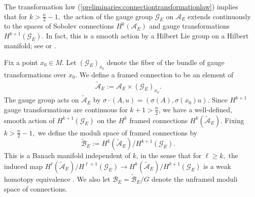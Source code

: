 \documentclass[12pt]{amsart}
\renewcommand{\1}{{\mathbf 1}}
\newcommand{\calB}{\mathcal{B}}
\newcommand{\calA}{\mathcal{A}}
\theoremstyle{others}
\numberwithin{equation}{section}
\begin{document}
The transformation law (\ref{preliminaries:connectiontransformationlaw}) implies that %
for $k > \frac{n}{2} - 1,$ the action of the gauge group $\mathcal{G}_E$ on $\calA_E$ extends continuously to the spaces of Sobolev connections \(H^k(\mathcal{A}_E)\) and gauge transformations \(H^{k+1}(\mathcal{G}_E)\). In fact, this is a smooth action by a Hilbert Lie group on a Hilbert manifold; see \cite[ and Appendix A]{freeduhlenbeck} or %
\cite[.1]{donkron}. \par 
Fix a point \(x_0 \in M\). Let $(\mathcal{G}_E)_{x_0}$ denote the fiber of the bundle of gauge transformations over $x_0.$ We define a framed connection to be an element of
\begin{align*}
    \tilde{\mathcal{A}}_E := \mathcal{A}_E \times (\mathcal{G}_E)_{x_0}.
\end{align*}The gauge group acts on \(\tilde{\mathcal{A}}_E\) by \(\sigma\cdot(A, u) = (\sigma(A), \sigma(x_0)u)\). Since \(H^{k+1}\) gauge transformations are continuous for \(k+1 > \frac{n}{2}\), we have a well-defined, smooth %
action of \(H^{k+1}(\mathcal{G}_E)\) on the \(H^k\) framed connections \(H^k(\tilde{\mathcal{A}}_E)\). Fixing $k > \frac{n}{2} - 1,$ we define the moduli space of framed connections by
$$\tilde{\mathcal{B}}_E:=H^k(\tilde{\mathcal{A}}_E)/H^{k+1}(\mathcal{G}_E).$$
This is a Banach manifold independent of \(k\), in the sense that for $\ell \geq k,$ the induced map \(H^\ell(\tilde{\mathcal{A}}_E)/H^{\ell+1}(\mathcal{G}_E) \to H^k(\tilde{\mathcal{A}}_E)/H^{k+1}(\mathcal{G}_E)\) %
is a weak homotopy equivalence \cite[\S 5.1.1]{donkron}. We also let $\calB_E = \tilde{\calB}_E / G$ denote the unframed moduli space of connections.






\vspace{5mm}
\end{document}
